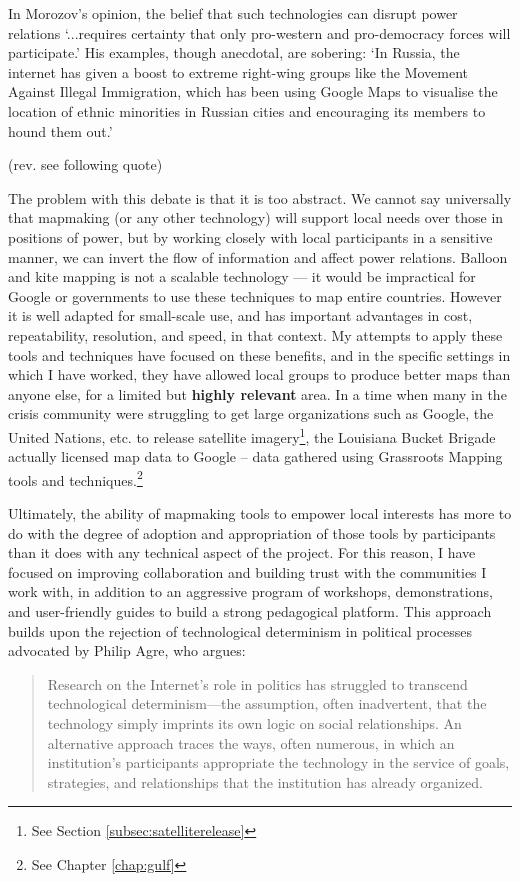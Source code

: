 \documentclass[11pt,oneside,notitlepage]{report}
\begin{document}
In Morozov's opinion, the belief that such technologies can disrupt power relations `...requires certainty that only pro-western and pro-democracy forces will participate.' His examples, though anecdotal, are sobering: `In Russia, the internet has given a boost to extreme right-wing groups like the Movement Against Illegal Immigration, which has been using Google Maps to visualise the location of ethnic minorities in Russian cities and encouraging its members to hound them out.' 

(rev. see following quote)

The problem with this debate is that it is too abstract. We cannot say universally that mapmaking (or any other technology) will support local needs over those in positions of power, but by working closely with local participants in a sensitive manner, we can invert the flow of information and affect power relations. Balloon and kite mapping is not a scalable technology --- it would be impractical for Google or governments to use these techniques to map entire countries. However it is well adapted for small-scale use, and has important advantages in cost, repeatability, resolution, and speed, in that context. My attempts to apply these tools and techniques have focused on these benefits, and in the specific settings in which I have worked, they have allowed local groups to produce better maps than anyone else, for a limited but \textbf{highly relevant} area. In a time when many in the crisis community were struggling to get large organizations such as Google, the United Nations, etc. to release satellite imagery\footnote{See Section \ref{subsec:satelliterelease}}, the Louisiana Bucket Brigade actually licensed map data to Google -- data gathered using Grassroots Mapping tools and techniques.\footnote{See Chapter \ref{chap:gulf}} 

Ultimately, the ability of mapmaking tools to empower local interests has more to do with the degree of adoption and appropriation of those tools by participants than it does with any technical aspect of the project. For this reason, I have focused on improving collaboration and building trust with the communities I work with, in addition to an aggressive program of workshops, demonstrations, and user-friendly guides to build a strong pedagogical platform. This approach builds upon the rejection of technological determinism in political processes advocated by Philip Agre, who argues: 

\begin{quote}
Research on the Internet’s role in politics has struggled to transcend technological determinism—the assumption, often inadvertent, that the technology simply imprints its own logic on social relationships. An alternative approach traces the ways, often numerous, in which an institution’s participants appropriate the technology in the service of goals, strategies, and relationships that the institution has already organized. \cite{agre2002realtime} 
\end{quote}
\end{document}
